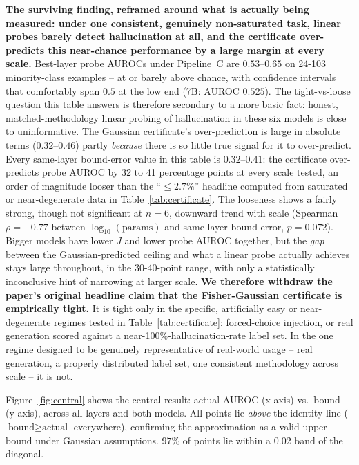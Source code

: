 \documentclass[onecolumn]{jmlr}
\begin{document}
\textbf{The surviving finding, reframed around what is actually being
measured: under one consistent, genuinely non-saturated task, linear
probes barely detect hallucination at all, and the certificate
over-predicts this near-chance performance by a large margin at every
scale.} Best-layer probe AUROCs under Pipeline~C are $0.53$--$0.65$ on 24-103
minority-class examples -- at or barely above chance, with confidence
intervals that comfortably span $0.5$ at the low end (7B: AUROC
$0.525$). The tight-vs-loose question this table answers is therefore
secondary to a more basic fact: honest, matched-methodology linear
probing of hallucination in these six models is close to uninformative.
The Gaussian certificate's over-prediction is large in absolute terms
($0.32$--$0.46$) partly \emph{because} there is so little true signal
for it to over-predict. Every same-layer bound-error value in this
table is $0.32$--$0.41$: the certificate over-predicts probe AUROC by 32
to 41 percentage points at every scale tested, an order of magnitude
looser than the ``$\leq 2.7\%$'' headline computed from saturated or
near-degenerate data in Table~\ref{tab:certificate}. The looseness shows
a fairly strong, though not significant at $n=6$, downward trend with
scale (Spearman $\rho = -0.77$ between $\log_{10}(\text{params})$ and
same-layer bound error, $p = 0.072$). Bigger models have lower $J$ and
lower probe AUROC together, but the \emph{gap} between the
Gaussian-predicted ceiling and what a linear probe actually achieves
stays large throughout, in the 30-40-point range, with only a
statistically inconclusive hint of narrowing at larger scale.
\textbf{We therefore withdraw the paper's original headline claim that
the Fisher-Gaussian certificate is empirically tight.} It is tight only
in the specific, artificially easy or near-degenerate regimes tested in
Table~\ref{tab:certificate}: forced-choice injection, or real
generation scored against a near-100\%-hallucination-rate label set. In
the one regime designed to be genuinely representative of real-world
usage -- real generation, a properly distributed label set, one
consistent methodology across scale -- it is not.

Figure~\ref{fig:central} shows the central result: actual AUROC
(x-axis) vs.\ bound (y-axis), across all layers and both models. All
points lie \emph{above} the identity line ($\text{bound} \geq
\text{actual}$ everywhere), confirming the approximation as a valid
upper bound under Gaussian assumptions. $97\%$ of points lie within a
$0.02$ band of the diagonal.
\end{document}
